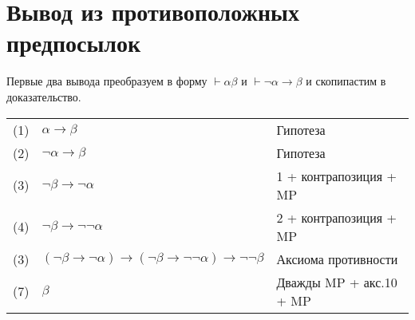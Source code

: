 \documentclass[12pt, a4paper]{article}
\begin{document}

\section{Вывод из противоположных предпосылок}


Первые два вывода преобразуем в форму $\vdash \alpha \beta$ и $\vdash \neg\alpha → \beta$ и скопипастим в доказательство.

  
\begin{tabular}{lll}
  (1) & $\alpha → \beta$ & Гипотеза \\
  (2) & $\neg \alpha → \beta$ & Гипотеза \\
  (3) & $\neg \beta → \neg \alpha$ & 1 + контрапозиция + MP \\
  (4) & $\neg \beta → \neg \neg \alpha$ & 2 + контрапозиция + MP \\
  (3) & $(\neg\beta → \neg \alpha) → (\neg\beta → \neg \neg \alpha) → \neg \neg \beta$ & Аксиома противности \\
  (7) & $\beta$ & Дважды MP + акс.10 + MP \\
\end{tabular}
\end{document}
